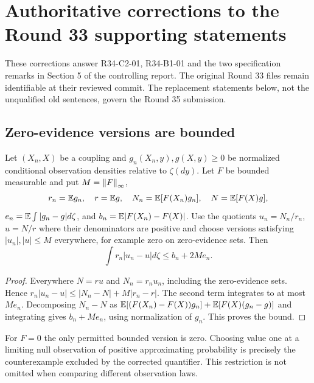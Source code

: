 \section{Authoritative corrections to the Round 33 supporting statements}
\label{sec:r35-errata}
These corrections answer R34-C2-01, R34-B1-01 and the two specification remarks in Section 5 of the controlling report. The original Round 33 files remain identifiable at their reviewed commit. The replacement statements below, not the unqualified old sentences, govern the Round 35 submission.

\subsection{Zero-evidence versions are bounded}
\begin{theorem}\label{thm:r35-bounded-evidence}
Let $(X_n,X)$ be a coupling and $g_n(X_n,y),g(X,y)\ge0$ be normalized conditional observation densities relative to $\zeta(dy)$. Let $F$ be bounded measurable and put $M=\left\|F\right\|_\infty$,
\[
 r_n=\mathbb E g_n,\quad r=\mathbb E g,\quad N_n=\mathbb E[F(X_n)g_n],\quad N=\mathbb E[F(X)g],
\]
$e_n=\mathbb E\int|g_n-g|d\zeta$, and $b_n=\mathbb E|F(X_n)-F(X)|$.
Use the quotients $u_n=N_n/r_n$, $u=N/r$ where their denominators are positive and choose versions satisfying $|u_n|,|u|\le M$ everywhere, for example zero on zero-evidence sets. Then
\[
 \int r_n|u_n-u|d\zeta\le b_n+2Me_n.
\]
\end{theorem}
\begin{proof}
Everywhere $N=ru$ and $N_n=r_nu_n$, including the zero-evidence sets. Hence
$r_n|u_n-u|\le|N_n-N|+M|r_n-r|$.
The second term integrates to at most $Me_n$. Decomposing $N_n-N$ as
$\mathbb E[(F(X_n)-F(X))g_n]+\mathbb E[F(X)(g_n-g)]$ and integrating gives $b_n+Me_n$, using normalization of $g_n$. This proves the bound.
\end{proof}
For $F=0$ the only permitted bounded version is zero. Choosing value one at a limiting null observation of positive approximating probability is precisely the counterexample excluded by the corrected quantifier. This restriction is not omitted when comparing different observation laws.

